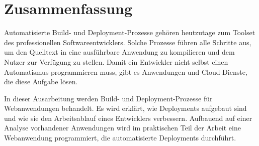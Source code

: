 \chapter*{Zusammenfassung}

Automatisierte Build- und Deployment-Prozesse gehören heutzutage zum Toolset des professionellen Softwareentwicklers. Solche Prozesse führen alle Schritte aus, um den Quelltext in eine ausführbare Anwendung zu kompilieren und dem Nutzer zur Verfügung zu stellen. Damit ein Entwickler nicht selbst einen Automatismus programmieren muss, gibt es Anwendungen und Cloud-Dienste, die diese Aufgabe lösen.

In dieser Ausarbeitung werden Build- und Deployment-Prozesse für Webanwendungen behandelt. Es wird erklärt, wie Deployments aufgebaut sind und wie sie den Arbeitsablauf eines Entwicklers verbessern. Aufbauend auf einer Analyse vorhandener Anwendungen wird im praktischen Teil der Arbeit eine Webanwendung programmiert, die automatisierte Deployments durchführt.
